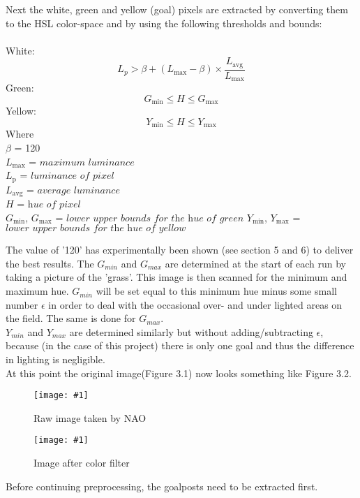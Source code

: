 \documentclass{ba-kecs}
\numberwithin{figure}{section}
\numberwithin{equation}{section}
\newcommand{\dkepic}[2]{ %
	\begin{figure}[H] %
	\texttt{[image: \#1]}
	\caption{#2}
	\label{#1}
	\end{figure}
}
\begin{document}
Next the white, green and yellow (goal) pixels are extracted by converting them to the HSL color-space and by using the following thresholds and bounds:\\ \\
White:
	\begin{equation}
	L_{p} > \beta + (L_{\mathrm{max}}-\beta) \times \frac{L_{\mathrm{avg}}}{L_{\mathrm{max}}} \label{whiteImgProc}
	\end{equation}
Green:
	\begin{equation}
	G_{\mathrm{min}} \leq H \leq G_{\mathrm{max}} \label{greenImgProc}
	\end{equation}
Yellow:
	\begin{equation}
	Y_{\mathrm{min}} \leq H \leq Y_{\mathrm{max}} \label{yellowImgProc}
	\end{equation}
Where \\
	$\beta$ = 120 \\
	$L_{\mathrm{max}}$ = $\textit{maximum luminance}$ \\
	$L_{\mathrm{p}}$ = $\textit{luminance of pixel}$ \\
	$L_{\mathrm{avg}}$ = $\textit{average luminance}$ \\
	$\textit{H}$ = $\textit{hue of pixel}$ \\
	$G_{\mathrm{min}}$, $G_{\mathrm{max}}$ = $\textit{lower upper bounds for 		the hue of green}$
	$Y_{\mathrm{min}}$, $Y_{\mathrm{max}}$ = $\textit{lower upper bounds for 		the hue of yellow}$
	
The value of '120' has experimentally been shown (see section 5 and 6) to deliver the best results. The $G_{min}$ and $G_{max}$ are determined at the start of each run by taking a picture of the 'grass'. This image is then scanned for the minimum and maximum hue. $G_{min}$ will be set equal to this minimum hue minus some small number $\epsilon$ in order to deal with the occasional over- and under lighted areas on the field. The same is done for $G_{max}$.\\
$Y_{min}$ and $Y_{max}$ are determined similarly but without adding/subtracting $\epsilon$, because (in the case of this project) there is only one goal and thus the difference in lighting is negligible.\\
At this point the original image(Figure 3.1) now looks something like Figure 3.2.\\
\dkepic{figure_IP1}{Raw image taken by NAO}
\dkepic{figure_IP2}{Image after color filter}
Before continuing preprocessing, the goalposts need to be extracted first.
\end{document}
